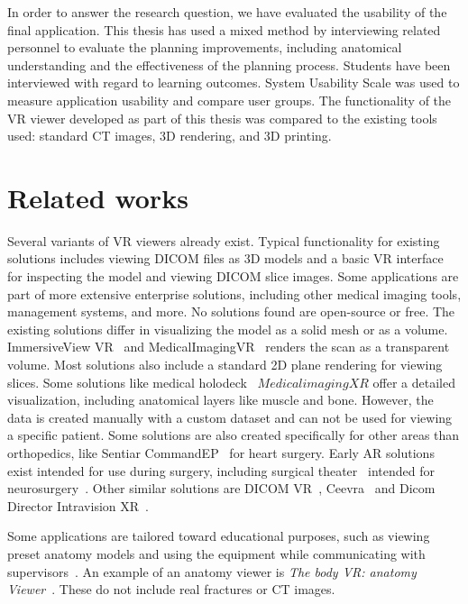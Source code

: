 \documentclass[a4paper]{report}
\begin{document}
In order to answer the research question, we have evaluated the usability of the final application.
This thesis has used a mixed method by interviewing related personnel to evaluate the planning improvements, including anatomical understanding and the effectiveness of the planning process. Students have been interviewed with regard to learning outcomes. System Usability Scale was used to measure application usability and compare user groups.
The functionality of the VR viewer developed as part of this thesis was compared to the existing tools used: standard CT images, 3D rendering, and 3D printing.


\section{Related works}

Several variants of VR viewers already exist. Typical functionality for existing solutions includes viewing DICOM files as 3D models and a basic VR interface for inspecting the model and viewing DICOM slice images. Some applications are part of more extensive enterprise solutions, including other medical imaging tools, management systems, and more. No solutions found are open-source or free.
The existing solutions differ in visualizing the model as a solid mesh or as a volume. ImmersiveView VR~\cite{noauthor_immersiveview_nodate} and MedicalImagingVR~\cite{noauthor_medicalimagingvr_nodate} renders the scan as a transparent volume. Most solutions also include a standard 2D plane rendering for viewing slices.
Some solutions like medical holodeck~\cite{medical_holodeck_medicalholodeck_nodate} $Medical imaging XR$ offer a detailed visualization, including anatomical layers like muscle and bone. However, the data is created manually with a custom dataset and can not be used for viewing a specific patient.
Some solutions are also created specifically for other areas than orthopedics, like Sentiar CommandEP~\cite{noauthor_commandep_nodate} for heart surgery.
Early AR solutions exist intended for use during surgery, including surgical theater~\cite{noauthor_virtual_nodate} intended for neurosurgery~\cite{anthony_patient-specific_2021}.
Other similar solutions are DICOM VR~\cite{noauthor_dicom_nodate-1}, Ceevra~\cite{ceevra_inc_using_2019} and Dicom Director Intravision XR~\cite{dicomdirectorcom_surgeons_nodate}.

Some applications are tailored toward educational purposes, such as viewing preset anatomy models and using the equipment while communicating with supervisors~\cite{uppot_implementing_2019}. An example of an anatomy viewer is \emph{The body VR: anatomy Viewer}~\cite{noauthor_body_nodate}. These do not include real fractures or CT images.
\end{document}
